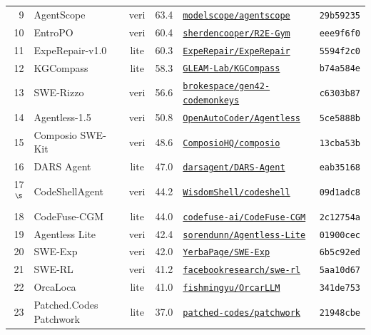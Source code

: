 \begin{table}[h]
\begin{tabular}{rlcrlc}
9 & AgentScope & veri & 63.4 & \href{https://github.com/modelscope/agentscope}{\texttt{modelscope/agentscope}} & \texttt{29b59235} \\
10 & EntroPO & veri & 60.4 & \href{https://github.com/sherdencooper/R2E-Gym}{\texttt{sherdencooper/R2E-Gym}} & \texttt{eee9f6f0} \\
11 & ExpeRepair-v1.0 & lite & 60.3 & \href{https://github.com/ExpeRepair/ExpeRepair}{\texttt{ExpeRepair/ExpeRepair}} & \texttt{5594f2c0} \\
12 & KGCompass & lite & 58.3 & \href{https://github.com/GLEAM-Lab/KGCompass}{\texttt{GLEAM-Lab/KGCompass}} & \texttt{b74a584e} \\
13 & SWE-Rizzo & veri & 56.6 & \href{https://github.com/brokespace/gen42-codemonkeys}{\texttt{brokespace/gen42-codemonkeys}} & \texttt{c6303b87} \\
14 & Agentless-1.5 & veri & 50.8 & \href{https://github.com/OpenAutoCoder/Agentless}{\texttt{OpenAutoCoder/Agentless}} & \texttt{5ce5888b} \\
15 & Composio SWE-Kit & veri & 48.6 & \href{https://github.com/ComposioHQ/composio}{\texttt{ComposioHQ/composio}} & \texttt{13cba53b} \\
16 & DARS Agent & lite & 47.0 & \href{https://github.com/darsagent/DARS-Agent}{\texttt{darsagent/DARS-Agent}} & \texttt{eab35168} \\
17$^{\S}$ & CodeShellAgent & veri & 44.2 & \href{https://github.com/WisdomShell/codeshell}{\texttt{WisdomShell/codeshell}} & \texttt{09d1adc8} \\
18 & CodeFuse-CGM & lite & 44.0 & \href{https://github.com/codefuse-ai/CodeFuse-CGM}{\texttt{codefuse-ai/CodeFuse-CGM}} & \texttt{2c12754a} \\
19 & Agentless Lite & veri & 42.4 & \href{https://github.com/sorendunn/Agentless-Lite}{\texttt{sorendunn/Agentless-Lite}} & \texttt{01900cec} \\
20 & SWE-Exp & veri & 42.0 & \href{https://github.com/YerbaPage/SWE-Exp}{\texttt{YerbaPage/SWE-Exp}} & \texttt{6b5c92ed} \\
21 & SWE-RL & veri & 41.2 & \href{https://github.com/facebookresearch/swe-rl}{\texttt{facebookresearch/swe-rl}} & \texttt{5aa10d67} \\
22 & OrcaLoca & lite & 41.0 & \href{https://github.com/fishmingyu/OrcarLLM}{\texttt{fishmingyu/OrcarLLM}} & \texttt{341de753} \\
23 & Patched.Codes Patchwork & lite & 37.0 & \href{https://github.com/patched-codes/patchwork}{\texttt{patched-codes/patchwork}} & \texttt{21948cbe} \\

\end{tabular}
\end{table}
